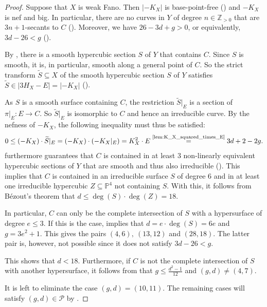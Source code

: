 \documentclass[english,11pt,reqno]{amsart}
\newcommand{\sub}{\subseteq}
\newcommand{\Pfour}{\mathbb{P}^4}
\newcommand{\Z}{\mathbb{Z}}
\begin{document}
\begin{proof}
Suppose that $X$ is weak Fano. Then $|-K_X|$ is base-point-free () and $-K_X $ is nef and big. In particular, there are no curves in $Y$ of degree $n\in\Z_{>0}$ that are $3n+1$-secants to $C$ (). Moreover, we have $26-3d+g>0$, or equivalently, $3d-26<g$ (). \par
By , there is a smooth hypercubic section $S$ of $Y$ that contains $C$. Since $S$ is smooth, it is, in particular, smooth along a general point of $C$. So the strict transform $\widetilde{S}\sub X$ of the smooth hypercubic section $S$ of $Y$ satisfies $\widetilde{S} \in |3 H_X-E|=|-K_X|$ (). \par 
As $S$ is a smooth surface containing $C$, the restriction $\widetilde{S}|_E$ is a section of $\pi|_E:E\rightarrow C$. So $\widetilde{S}|_E$ is isomorphic to $C$ and hence an irreducible curve. By the nefness of $-K_X$, the following inequality must thus be satisfied:
$$0\leq (-K_X) \cdot \widetilde{S}|_E = (-K_X)\cdot(-K_X|_E) = K_X^2 \cdot E \overset{\textup{\ref{lem:K_X_squared_times_E}}}{=} 3d+2-2g. $$
 furthermore guarantees that $C$ is contained in at least 3 non-linearly equivalent hypercubic sections of $Y$ that are smooth and thus also irreducible (). This implies that $C$ is contained in an irreducible surface $S$ of degree 6 and in at least one irreducible hypercubic $Z\sub \Pfour$ not containing $S$. With this, it follows from Bézout's theorem that $d\leq \deg(S) \cdot \deg(Z)= 18$.\par
In particular, $C$ can only be the complete intersection of $S$ with a hypersurface of degree $e\leq 3$. If this is the case,  implies that $d=e\cdot\deg(S)=6e$ and $g= 3e^2+1$. This gives the pairs $(4,6), \:(13,12)$ and $(28,18)$. The latter pair is, however, not possible since it does not satisfy $3d-26<g$.\par
This shows that $d<18$. Furthermore, if $C$ is not the complete intersection of $S$ with another hypersurface, it follows from  that $g\leq \frac{d^2-1}{12}$ and $(g,d)\neq(4,7)$. \par 
It is left to eliminate the case $(g,d)=(10,11)$. The remaining cases will satisfy $(g,d)\in\mathcal{P}$ by . \par 

\end{proof}
\end{document}
